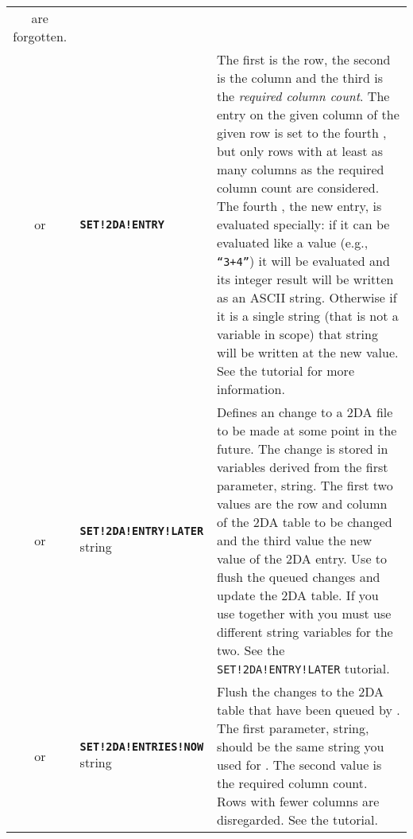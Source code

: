 \documentclass{article}
\def\ttref#1{\ahrefloc{#1}{\tt #1}}
\def\DEFINE#1{{\tt \bf #1}\label{#1}\index{#1}}
\def\DEFSYN#1{{\tt \bf #1}\index{#1}}
\def\t#1{{\tt #1}}
\begin{document}
\begin{tabular}{cp{10in}|p{10in}}
    are forgotten. \\
or & \DEFSYN{SET!2DA!ENTRY} \ttref{value} \ttref{value} \ttref{value}
\ttref{value} &
  The first \ttref{value} is the row, the second is the column and the
  third is the \emph{required column count}. The entry on the given column
  of the given row is set to the fourth \ttref{value}, but only rows with
  at least as many columns as the required column count are considered.
  The fourth \ttref{value}, the new entry, is evaluated specially: if it
  can be evaluated like a value (e.g., \t{``3+4''}) it will be evaluated
  and its integer result will be written as an ASCII string. Otherwise if
  it is a single string (that is not a variable in scope) that string will
  be written at the new value.
  See
  the \ttref{SET!2DA!ENTRY} tutorial for more information. \\

  or & \DEFINE{SET!2DA!ENTRY!LATER} string \ttref{value} \ttref{value}
  \ttref{value} &

  Defines an change to a 2DA file to be made at some point in the
  future. The change is stored in variables derived from the
  first parameter, string. The first two values are the row and column
  of the 2DA table to be changed and the third value the new value of
  the 2DA entry. Use \ttref{SET!2DA!ENTRIES!NOW} to flush the queued
  changes and update the 2DA table. If you use
  \ttref{SET!2DA!ENTRY!LATER} together with
  \ttref{READ!2DA!ENTRY!FORMER} you must use different string
  variables for the two. See the \t{SET!2DA!ENTRY!LATER} tutorial. \\

  or & \DEFSYN{SET!2DA!ENTRIES!NOW} string \ttref{value} &

  Flush the changes to the 2DA table that have been queued by
  \ttref{SET!2DA!ENTRY!LATER}. The first parameter, string, should be
  the same string you used for \ttref{SET!2DA!ENTRY!LATER}. The second
  value is the required column count. Rows with fewer columns are
  disregarded. See the \ttref{SET!2DA!ENTRIES!NOW} tutorial. \\


\end{tabular}
\end{document}

